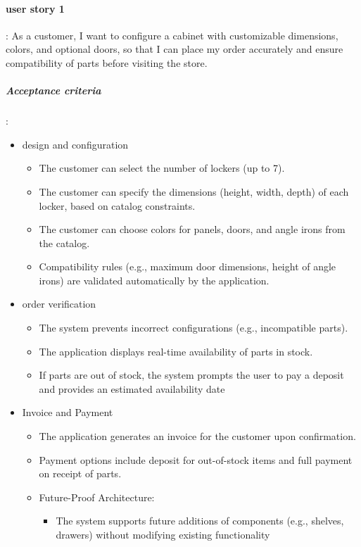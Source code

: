 \documentclass{article}
\begin{document}
\paragraph{user story 1}:
As a customer, I want to configure a cabinet with customizable dimensions, colors, and
optional doors, so that I can place my order accurately and ensure compatibility of parts
before visiting the store.
\subparagraph{Acceptance criteria}:
\begin{itemize}
    \item design and configuration
    \begin{itemize}
        \item The customer can select the number of lockers (up to 7).
        \item The customer can specify the dimensions (height, width, depth) of each locker, based on catalog constraints.
        \item The customer can choose colors for panels, doors, and angle irons from the catalog.
        \item Compatibility rules (e.g., maximum door dimensions, height of angle irons) are validated automatically by the application.
    \end{itemize}
    \item order verification
    \begin{itemize}
        \item The system prevents incorrect configurations (e.g., incompatible parts).
        \item The application displays real-time availability of parts in stock.
        \item If parts are out of stock, the system prompts the user to pay a deposit and provides an estimated availability date
    \end{itemize}
    \item Invoice and Payment
    \begin{itemize}
        \item The application generates an invoice for the customer upon confirmation.
        \item Payment options include deposit for out-of-stock items and full payment on receipt of parts.
    \item Future-Proof Architecture:
    \begin{itemize}
        \item The system supports future additions of components (e.g., shelves, drawers) without modifying existing functionality
    \end{itemize}
    \end{itemize}

\end{itemize}
\end{document}
